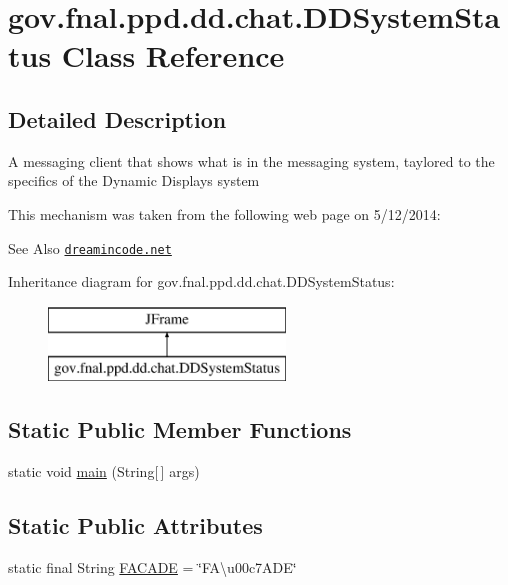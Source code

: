 \hypertarget{classgov_1_1fnal_1_1ppd_1_1dd_1_1chat_1_1DDSystemStatus}{\section{gov.\-fnal.\-ppd.\-dd.\-chat.\-D\-D\-System\-Status Class Reference}
\label{classgov_1_1fnal_1_1ppd_1_1dd_1_1chat_1_1DDSystemStatus}
}


\subsection{Detailed Description}
A messaging client that shows what is in the messaging system, taylored to the specifics of the Dynamic Displays system 

This mechanism was taken from the following web page on 5/12/2014\-: \begin{DoxySeeAlso}{See Also}
\href{http://www.dreamincode.net/forums/topic/259777-a-simple-chat-program-with-clientserver-gui-optional/}{\tt dreamincode.\-net} 
\end{DoxySeeAlso}
Inheritance diagram for gov.\-fnal.\-ppd.\-dd.\-chat.\-D\-D\-System\-Status\-:\begin{figure}[H]
\begin{center}
\leavevmode
\includegraphics[height=2.000000cm]{classgov_1_1fnal_1_1ppd_1_1dd_1_1chat_1_1DDSystemStatus}
\end{center}
\end{figure}
\subsection*{Static Public Member Functions}
\begin{DoxyCompactItemize}
\item 
static void \hyperlink{classgov_1_1fnal_1_1ppd_1_1dd_1_1chat_1_1DDSystemStatus_a5d501562eb6c4e85b7be34d7477eb4d1}{main} (String\mbox{[}$\,$\mbox{]} args)
\end{DoxyCompactItemize}
\subsection*{Static Public Attributes}
\begin{DoxyCompactItemize}
\item 
static final String \hyperlink{classgov_1_1fnal_1_1ppd_1_1dd_1_1chat_1_1DDSystemStatus_a4a11894738a02fa522ea3ca3b8523cae}{F\-A\-C\-A\-D\-E} = \char`\"{}F\-A\textbackslash{}u00c7\-A\-D\-E\char`\"{}
\end{DoxyCompactItemize}


